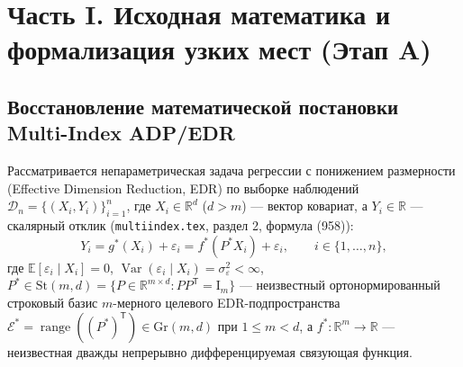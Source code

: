 \documentclass[11pt,a4paper]{article}
\newcommand{\R}{\mathbb{R}}
\newcommand{\E}{\mathbb{E}}
\newcommand{\Var}{\operatorname{Var}}
\newcommand{\Id}{\mathrm{I}}
\newcommand{\T}{^{\mathsf{T}}}
\newcommand{\Gr}{\mathrm{Gr}}
\newcommand{\St}{\mathrm{St}}
\newcommand{\PEDRs}{P^{*}}
\theoremstyle{definition}
\theoremstyle{remark}
\begin{document}
\tableofcontents
\newpage

\section{Часть I. Исходная математика и формализация узких мест (Этап A)}
\label{sec:part1}

\subsection{Восстановление математической постановки Multi-Index ADP/EDR}

Рассматривается непараметрическая задача регрессии с понижением размерности (Effective Dimension Reduction, EDR) по выборке наблюдений $\mathcal{D}_n = \{(X_i, Y_i)\}_{i=1}^n$, где $X_i \in \R^d$ ($d > m$) --- вектор ковариат, а $Y_i \in \R$ --- скалярный отклик (\texttt{multiindex.tex}, раздел 2, формула (958)):
\begin{equation}\label{eq:mi_model}
    Y_i = g^*(X_i) + \varepsilon_i = f^*(\PEDRs X_i) + \varepsilon_i, \qquad i \in \{1, \ldots, n\},
\end{equation}
где $\E[\varepsilon_i \mid X_i] = 0$, $\Var(\varepsilon_i \mid X_i) = \sigma_\varepsilon^2 < \infty$, $\PEDRs \in \St(m,d) = \{P \in \R^{m \times d} : P P\T = \Id_m\}$ --- неизвестный ортонормированный строковый базис $m$-мерного целевого EDR-подпространства $\mathcal{E}^* = \operatorname{range}((\PEDRs)\T) \in \Gr(m,d)$ при $1 \le m < d$, а $f^*: \R^m \to \R$ --- неизвестная дважды непрерывно дифференцируемая связующая функция.
\end{document}
